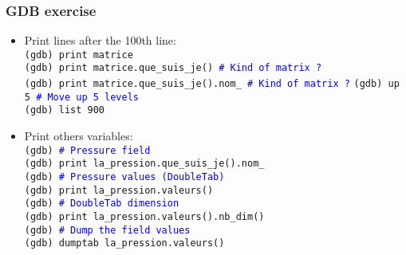 \documentclass[10pt, hyperref={unicode=true,pdfusetitle, bookmarks=true,bookmarksnumbered=false,bookmarksopen=false, breaklinks=false,pdfborder={0 0 1},backref=true,colorlinks=true,linkcolor=darkblue,pageanchor, urlcolor=darkblue}]{beamer}
\begin{document}
\begin{frame}
\frametitle{GDB exercise}
\begin{block}{}

\begin{itemize}
\item Print lines after the 100th line:\\
\texttt{(gdb) print matrice}\\
\texttt{(gdb) print matrice.que\_suis\_je() \textcolor{blue}{\# Kind of matrix ?}}\\
\texttt{(gdb) print matrice.que\_suis\_je().nom\_ \textcolor{blue}{\# Kind of matrix ?}}
\texttt{(gdb) up 5 \textcolor{blue}{\# Move up 5 levels}}\\
\texttt{(gdb) list 900}

\item Print others variables:\\
\texttt{(gdb) \textcolor{blue}{\# Pressure field}}\\
\texttt{(gdb) print la\_pression.que\_suis\_je().nom\_}\\
\texttt{(gdb) \textcolor{blue}{\# Pressure values (DoubleTab)}}\\
\texttt{(gdb) print la\_pression.valeurs()}\\
\texttt{(gdb) \textcolor{blue}{\# DoubleTab dimension}}\\
\texttt{(gdb) print la\_pression.valeurs().nb\_dim()}\\
\texttt{(gdb) \textcolor{blue}{\# Dump the field values}}\\
\texttt{(gdb) dumptab la\_pression.valeurs()}
\end{itemize}

\end{block}
\end{frame}
\end{document}
